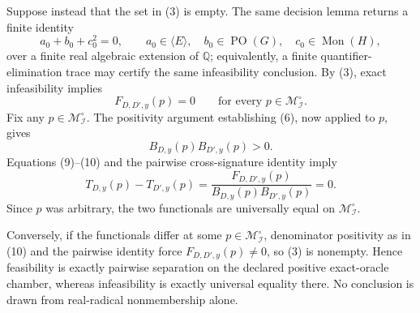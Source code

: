 Suppose instead that the set in (3) is empty.  The same decision lemma returns a finite identity
\[
 a_0+b_0+c_0^2=0,
 \qquad
 a_0\in\langle E\rangle,
 \quad b_0\in\operatorname{PO}(G),
 \quad c_0\in\operatorname{Mon}(H),
\tag{8}
\]
over a finite real algebraic extension of \(\mathbb Q\); equivalently, a finite quantifier-elimination trace may certify the same infeasibility conclusion.  By (3), exact infeasibility implies
\[
 F_{D,D',y}(p)=0
 \qquad\text{for every }p\in\mathcal M_{\mathcal I}^{\circ}.
\tag{9}
\]
Fix any \(p\in\mathcal M_{\mathcal I}^{\circ}\).  The positivity argument establishing (6), now applied to \(p\), gives
\[
 B_{D,y}(p)B_{D',y}(p)>0.
\tag{10}
\]
Equations (9)--(10) and the pairwise cross-signature identity imply
\[
 T_{D,y}(p)-T_{D',y}(p)
 =\frac{F_{D,D',y}(p)}{B_{D,y}(p)B_{D',y}(p)}=0.
\tag{11}
\]
Since \(p\) was arbitrary, the two functionals are universally equal on \(\mathcal M_{\mathcal I}^{\circ}\).

Conversely, if the functionals differ at some \(p\in\mathcal M_{\mathcal I}^{\circ}\), denominator positivity as in (10) and the pairwise identity force \(F_{D,D',y}(p)\neq0\), so (3) is nonempty.  Hence feasibility is exactly pairwise separation on the declared positive exact-oracle chamber, whereas infeasibility is exactly universal equality there.  No conclusion is drawn from real-radical nonmembership alone.
